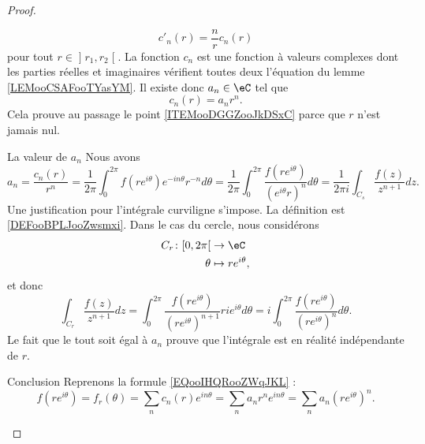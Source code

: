 \begin{proof}
\begin{subproof}
\begin{equation}
            c'_n(r)=\frac{ n }{ r }c_n(r)
        \end{equation}
    pour tout \( r\in \mathopen] r_1 , r_2 \mathclose[\). La fonction \( c_n\) est une fonction à valeurs complexes dont les parties réelles et imaginaires vérifient toutes deux l'équation du lemme \ref{LEMooCSAFooTYasYM}. Il existe donc \( a_n\in \eC\) tel que
        \begin{equation}
            c_n(r)=a_nr^n.
        \end{equation}
        Cela prouve au passage le point \ref{ITEMooDGGZooJkDSxC} parce que \( r\) n'est jamais nul.
    \item[La valeur de \( a_n\)]
        Nous avons
        \begin{equation}        \label{EQooFNUHooZbbNAT}
                a_n=\frac{ c_n(r) }{ r^n }=\frac{1}{ 2\pi }\int_0^{2\pi}f(r e^{i\theta}) e^{-in\theta}r^{-n}d\theta
                =\frac{1}{ 2\pi }\int_0^{2\pi}\frac{ f(r e^{i\theta}) }{ ( e^{i\theta}r)^n }d\theta
                =\frac{1}{ 2\pi i }\int_{C_s}\frac{ f(z) }{ z^{n+1} }dz.
        \end{equation}
        Une justification pour l'intégrale curviligne s'impose. La définition est \ref{DEFooBPLJooZwsmxi}. Dans le cas du cercle, nous considérons
        \begin{equation}
            \begin{aligned}
                C_r\colon \mathopen[ 0 , 2\pi \mathclose[&\to \eC \\
                    \theta&\mapsto r e^{i\theta}, 
            \end{aligned}
        \end{equation}
        et donc
        \begin{equation}
            \int_{C_r}\frac{ f(z) }{ z^{n+1} }dz=\int_0^{2\pi}\frac{ f(r e^{i\theta}) }{ (r e^{i\theta})^{n+1} }ri e^{i\theta}d\theta=i\int_0^{2\pi}\frac{ f(r e^{i\theta}) }{ (r e^{i\theta})^n }d\theta.
        \end{equation}
        Le fait que le tout soit égal à \( a_n\) prouve que l'intégrale est en réalité indépendante de \( r\).
    \item[Conclusion]
        Reprenons la formule \eqref{EQooIHQRooZWqJKL} :
        \begin{equation}
            f(r e^{i\theta})=f_r(\theta)=\sum_nc_n(r) e^{in\theta}=\sum_na_nr^n e^{in\theta}=\sum_na_n(r e^{i\theta})^n.
        \end{equation}

\end{subproof}
\end{proof}
